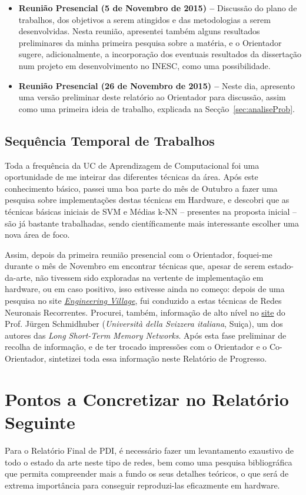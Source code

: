 \documentclass[a4paper, onecolumn, 10pt]{article}
\begin{document}
\begin{itemize}
		\item
			\textbf{Reunião Presencial (5 de Novembro de 2015) --} Discussão do plano de trabalhos, dos objetivos a serem atingidos e das metodologias a serem desenvolvidas. Nesta reunião, apresentei também alguns resultados preliminares da minha primeira pesquisa sobre a matéria, e o Orientador sugere, adicionalmente, a incorporação dos eventuais resultados da dissertação num projeto em desenvolvimento no INESC, como uma possibilidade.

		\item
			\textbf{Reunião Presencial (26 de Novembro de 2015) --} Neste dia, apresento uma versão preliminar deste relatório ao Orientador para discussão, assim como uma primeira ideia de trabalho, explicada na Secção~\ref{sec:analiseProb}.
	\end{itemize}

	\subsection{Sequência Temporal de Trabalhos}
	Toda a frequência da UC de Aprendizagem de Computacional foi uma oportunidade de me inteirar das diferentes técnicas da área. Após este conhecimento básico, passei uma boa parte do mês de Outubro a fazer uma pesquisa sobre implementações destas técnicas em Hardware, e descobri que as técnicas básicas iniciais de SVM e Médias k-NN -- presentes na proposta inicial -- são já bastante trabalhadas, sendo científicamente mais interessante escolher uma nova área de foco.

	Assim, depois da primeira reunião presencial com o Orientador, foquei-me durante o mês de Novembro em encontrar técnicas que, apesar de serem estado-da-arte, não tivessem sido exploradas na vertente de implementação em hardware, ou em caso positivo, isso estivesse ainda no começo: depois de uma pesquisa no site \href{http://www.engineeringvillage.com/}{\textit{Engineering Village}}, fui conduzido a estas técnicas de Redes Neuronais Recorrentes. Procurei, também, informação de alto nível no \href{http://people.idsia.ch/~juergen/rnn.html}{site} do Prof. Jürgen Schmidhuber (\textit{Università della Svizzera italiana}, Suiça), um dos autores das \textit{Long Short-Term Memory Networks}. Após esta fase preliminar de recolha de informação, e de ter trocado impressões com o Orientador e o Co-Orientador, sintetizei toda essa informação neste Relatório de Progresso.

	\section{Pontos a Concretizar no Relatório Seguinte}
	Para o Relatório Final de PDI, é necessário fazer um levantamento exaustivo de todo o estado da arte neste tipo de redes, bem como uma pesquisa bibliográfica que permita compreender mais a fundo os seus detalhes teóricos, o que será de extrema importância para conseguir reproduzi-las eficazmente em hardware.
\end{document}
